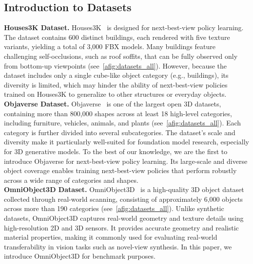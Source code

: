 \subsection{Introduction to Datasets}

\textbf{Houses3K Dataset.} Houses3K~\cite{peralta2020next} is designed for next-best-view policy learning.  
The dataset contains 600 distinct buildings, each rendered with five texture variants, yielding a total of 3,000 FBX models.  
Many buildings feature challenging self-occlusions, such as roof soffits, that can be fully observed only from bottom-up viewpoints (see~\cref{afig:datasets_all}). 
However, because the dataset includes only a single cube-like object category (e.g., buildings), its diversity is limited, which may hinder the ability of next-best-view policies trained on Houses3K to generalize to other structures or everyday objects.
\\
\textbf{Objaverse Dataset.} 
Objaverse~\cite{Deitke_2023_CVPR} is one of the largest open 3D datasets, containing more than 800,000 shapes across at least 18 high-level categories, including furniture, vehicles, animals, and plants (see~\cref{afig:datasets_all}).   
Each category is further divided into several subcategories.  
The dataset’s scale and diversity make it particularly well-suited for foundation model research, especially for 3D generative models.  
To the best of our knowledge, we are the first to introduce Objaverse for next-best-view policy learning.  
Its large-scale and diverse object coverage enables training next-best-view policies that perform robustly across a wide range of categories and shapes.
\\
\textbf{OmniObject3D Dataset.}
OmniObject3D~\cite{wu2023omniobject3d} is a high-quality 3D object dataset collected through real-world scanning, consisting of approximately 6,000 objects across more than 190 categories (see~\cref{afig:datasets_all}).  
Unlike synthetic datasets, OmniObject3D captures real-world geometry and texture details using high-resolution 2D and 3D sensors.  
It provides accurate geometry and realistic material properties, making it commonly used for evaluating real-world transferability in vision tasks such as novel-view synthesis.  
In this paper, we introduce OmniObject3D for benchmark purposes.


